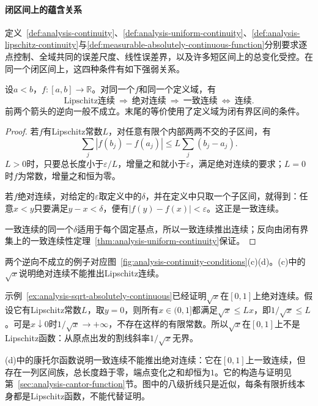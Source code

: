 \paragraph{闭区间上的蕴含关系}
定义~\ref{def:analysis-continuity}、\ref{def:analysis-uniform-continuity}、\ref{def:analysis-lipschitz-continuity}与\ref{def:measurable-absolutely-continuous-function}分别要求逐点控制、全域共同的误差尺度、线性误差界，以及许多短区间上的总变化受控。在同一个闭区间上，这四种条件有如下强弱关系。
\begin{theorem}[闭区间上连续性条件的关系]
\label{thm:analysis-continuity-implications}
设$a<b$，$f:[a,b]\to\mathbb R$。对同一个$f$和同一个定义域，有
\[
 \text{Lipschitz连续}\ \Longrightarrow\ \text{绝对连续}
 \ \Longrightarrow\ \text{一致连续}\ \Longleftrightarrow\ \text{连续}.
\]
前两个箭头的逆向一般不成立。末尾的等价使用了定义域为闭有界区间的条件。
\end{theorem}
\begin{proof}
若$f$有Lipschitz常数$L$，对任意有限个内部两两不交的子区间，有
\[
 \sum_j|f(b_j)-f(a_j)|\leq L\sum_j(b_j-a_j).
\]
$L>0$时，只要总长度小于$\varepsilon/L$，增量之和就小于$\varepsilon$，满足绝对连续的要求；$L=0$时$f$为常数，增量之和恒为零。

若$f$绝对连续，对给定的$\varepsilon$取定义中的$\delta$，并在定义中只取一个子区间，就得到：任意$x<y$只要满足$y-x<\delta$，便有$|f(y)-f(x)|<\varepsilon$。这正是一致连续。

一致连续的同一个$\delta$适用于每个固定基点，所以一致连续推出连续；反向由闭有界集上的一致连续性定理~\ref{thm:analysis-uniform-continuity}保证。
\end{proof}
两个逆向不成立的例子对应图~\ref{fig:analysis-continuity-conditions}(c)(d)。(c)中的$\sqrt x$说明绝对连续不能推出Lipschitz连续。
\begin{example}
\label{ex:analysis-sqrt-not-lipschitz}
示例~\ref{ex:analysis-sqrt-absolutely-continuous}已经证明$\sqrt x$在$[0,1]$上绝对连续。假设它有Lipschitz常数$L$，取$y=0$，则所有$x\in(0,1]$都满足$\sqrt x\leq Lx$，即$1/\sqrt x\leq L$。可是$x\downarrow0$时$1/\sqrt x\to+\infty$，不存在这样的有限常数。所以$\sqrt x$在$[0,1]$上不是Lipschitz函数：从原点出发的割线斜率$1/\sqrt x$无界。
\end{example}
(d)中的康托尔函数说明一致连续不能推出绝对连续：它在$[0,1]$上一致连续，但存在一列区间族，总长度趋于零，端点变化之和却恒为$1$。它的构造与证明见第~\ref{sec:analysis-cantor-function}节。图中的八级折线只是近似，每条有限折线本身都是Lipschitz函数，不能代替证明。

